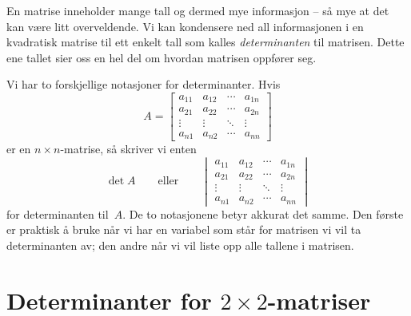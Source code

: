 

\label{ch:determinanter}

En matrise inneholder mange tall og dermed mye informasjon -- så mye
at det kan være litt overveldende.  Vi kan kondensere ned all
informasjonen i en kvadratisk matrise til ett enkelt tall som kalles
\emph{determinanten} til matrisen.  Dette ene tallet sier oss en hel
del om hvordan matrisen oppfører seg.

Vi har to forskjellige notasjoner for determinanter.
Hvis
\[
A =
\begin{bmatrix}
a_{11} & a_{12} & \cdots & a_{1n} \\
a_{21} & a_{22} & \cdots & a_{2n} \\
\vdots & \vdots & \ddots & \vdots \\
a_{n1} & a_{n2} & \cdots & a_{nn}
\end{bmatrix}
\]
er en $n \times n$-matrise, så skriver vi enten
\[
\det A
\qquad\text{eller}\qquad
\begin{vmatrix}
a_{11} & a_{12} & \cdots & a_{1n} \\
a_{21} & a_{22} & \cdots & a_{2n} \\
\vdots & \vdots & \ddots & \vdots \\
a_{n1} & a_{n2} & \cdots & a_{nn}
\end{vmatrix}
\]
for determinanten til~$A$.  De to notasjonene betyr akkurat det samme.
Den første er praktisk å bruke når vi har en variabel som står for
matrisen vi vil ta determinanten av; den andre når vi vil liste opp
alle tallene i matrisen.



\section*{Determinanter for $2 \times 2$-matriser}

